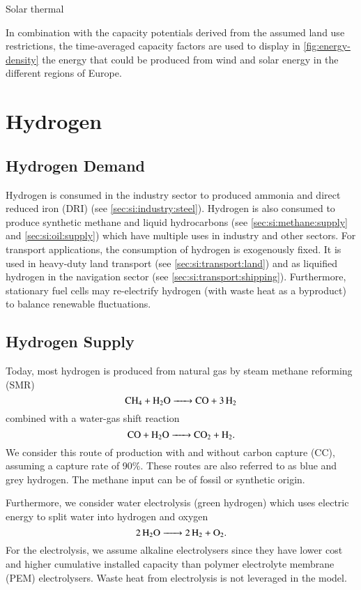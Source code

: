 Solar thermal

In combination with the capacity potentials derived from the assumed land use restrictions,
the time-averaged capacity factors are used to display in \cref{fig:energy-density} the energy that could be produced from wind and solar energy in the different regions of Europe.

\section{Hydrogen}
\label{sec:si:h2}

\subsection{Hydrogen Demand}
\label{sec:si:h2:demand}

Hydrogen is consumed in the industry sector to produced ammonia and direct
reduced iron (DRI) (see \cref{sec:si:industry:steel}). Hydrogen is also consumed
to produce synthetic methane and liquid hydrocarbons (see
\cref{sec:si:methane:supply} and \cref{sec:si:oil:supply}) which have multiple
uses in industry and other sectors. For transport applications, the consumption
of hydrogen is exogenously fixed. It is used in heavy-duty land transport (see
\cref{sec:si:transport:land}) and as liquified hydrogen in the navigation sector
(see \cref{sec:si:transport:shipping}). Furthermore, stationary fuel cells may
re-electrify hydrogen (with waste heat as a byproduct) to balance renewable
fluctuations.

\subsection{Hydrogen Supply}
\label{sec:si:h2:supply}

Today, most hydrogen is produced from natural gas by steam methane reforming
(SMR)
\begin{equation}
    \ce{ CH4 + H2O -> CO + 3H2 }
\end{equation}
combined with a water-gas shift reaction
\begin{equation}
    \ce{CO + H2O -> CO2 + H2}.
\end{equation}
We consider this route of production with and without carbon capture (CC),
assuming a capture rate of 90\%. These routes are also referred to as blue and
grey hydrogen. The methane input can be of fossil or synthetic origin.

Furthermore, we consider water electrolysis (green hydrogen) which uses electric
energy to split water into hydrogen and oxygen
\begin{equation}
    \ce{2H2O -> 2 H2 + O2}.
\end{equation}
For the electrolysis, we assume alkaline electrolysers since they have lower
cost \citeS{} and higher cumulative installed capacity \citeS{} than polymer
electrolyte membrane (PEM) electrolysers. Waste heat from electrolysis is not
leveraged in the model.

